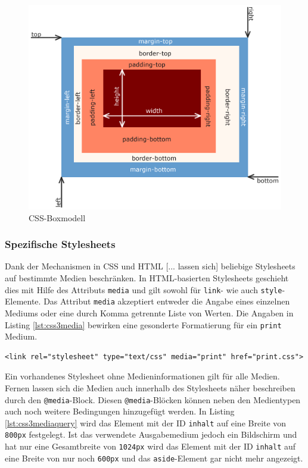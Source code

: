 \vspace{1em}
\begin{figure}[htb]
  \centering
  \includegraphics[width=0.8\linewidth]{abb/css_boxmodell}
  \caption[CSS-Boxmodell]{CSS-Boxmodell\cite{WikiCSS2014}}
  \label{fig:cssboxmodell}
\end{figure}	
	
\subsubsection{Spezifische Stylesheets} \glqq Dank der Mechanismen in CSS und HTML [... lassen sich] beliebige Stylesheets auf bestimmte Medien beschränken. In HTML-basierten Stylesheets geschieht dies mit Hilfe des Attributs \texttt{media} und gilt sowohl für \texttt{link}- wie auch \texttt{style}-Elemente. Das Attribut \texttt{media} akzeptiert entweder die Angabe eines einzelnen Mediums oder eine durch Komma getrennte Liste von Werten.\grqq{}\cite[S.434ff]{MeyeCasc2005} Die Angaben in Listing \ref{lst:css3media} bewirken eine gesonderte Formatierung für ein \texttt{print} Medium.

\vspace{1em}
\begin{lstlisting}[language=HTML5, caption=CSS3 medienspezifisches Stylesheet, label=lst:css3media]
<link rel="stylesheet" type="text/css" media="print" href="print.css">
\end{lstlisting}
	
Ein vorhandenes Stylesheet ohne Medieninformationen gilt für alle Medien. Fernen lassen sich die Medien auch innerhalb des Stylesheets näher beschreiben durch den \texttt{@media}-Block. Diesen \texttt{@media}-Blöcken können neben den Medientypen auch noch weitere Bedingungen hinzugefügt werden. In Listing \ref{lst:css3mediaquery} wird das Element mit der ID \texttt{inhalt} auf eine Breite von \texttt{800px} festgelegt. Ist das verwendete Ausgabemedium jedoch ein Bildschirm und hat nur eine Gesamtbreite von \texttt{1024px} wird das Element mit der ID \texttt{inhalt} auf eine Breite von nur noch \texttt{600px} und das \texttt{aside}-Element gar nicht mehr angezeigt.

